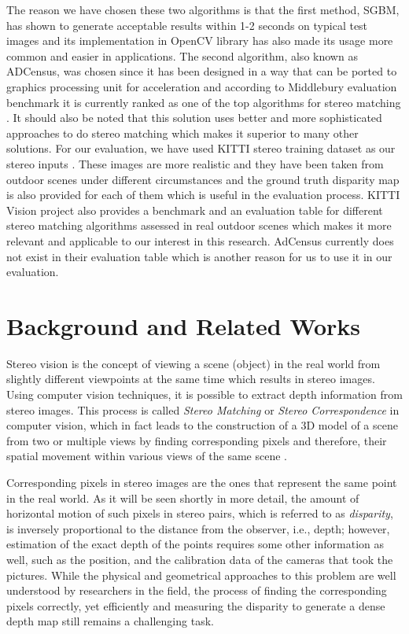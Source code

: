 \documentclass[dvips,letterpaper,12pt]{report}
\begin{document}
The reason we have chosen these two algorithms is that the first method, SGBM, has shown to generate acceptable results within 1-2 seconds on typical test images \cite{hir08} and 
its implementation in OpenCV library has also made its usage more common and easier in applications. The second algorithm, also known as ADCensus, was chosen since it has been designed in a way that
can be ported to graphics processing unit for acceleration and according to Middlebury evaluation benchmark it is currently ranked as one of the top algorithms for stereo matching \cite{mideval}.
It should also be noted that this solution uses better and more sophisticated approaches to do stereo matching which makes it superior to many other solutions. \newline
For our evaluation, we have used KITTI stereo training dataset as our stereo inputs \cite{kitti}. 
These images are more realistic and they have been taken from outdoor scenes under different circumstances 
and the ground truth disparity map is also provided for each of them which is useful in the evaluation process. KITTI Vision project also provides a benchmark and an evaluation table
for different stereo
matching algorithms assessed in real outdoor scenes which makes it more relevant and applicable to our interest in this research. 
AdCensus currently does not exist in their evaluation table which is another reason for us to use it in our evaluation.


\chapter{Background and Related Works}
Stereo vision is the concept of viewing a scene (object) in the real world from slightly different
viewpoints at the same time which results in stereo images. Using computer vision techniques, it is possible to extract depth information from stereo
images. This process is called {\it Stereo Matching} or {\it Stereo Correspondence} in computer vision,
which in fact leads to the construction of a
3D model of a scene from two or multiple views by finding corresponding pixels and therefore, their spatial movement within various views of the same scene \cite{sze11}.

Corresponding pixels in stereo images are the ones that represent the same point in the real
world. As it will be seen shortly in more detail, the amount of horizontal motion of such pixels
in stereo pairs, which is referred to as {\it disparity}, is inversely proportional to the
distance from the observer, i.e., depth; however,  estimation of the exact depth of the points requires some
other information as well, such as the position, and the calibration data of the cameras that took the pictures.
While the physical and geometrical approaches to this problem are well understood by researchers in the field, the process of finding the corresponding pixels correctly, yet efficiently
and measuring the disparity to generate a dense depth map still remains a challenging task. \newline
\end{document}
